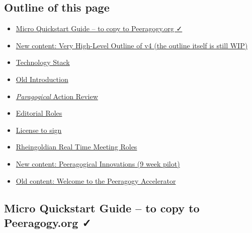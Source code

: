 \hypertarget{outline-of-this-page}{%
\subsection{Outline of this page}\label{outline-of-this-page}}

\begin{itemize}
\tightlist
\item
  \href{http://peeragogy.github.io/action.html\#micro-quickstart-guide--to-copy-to-peeragogyorg-}{Micro
  Quickstart Guide -- to copy to Peeragogy.org ✓}
\item
  \href{http://peeragogy.github.io/action.html\#new-content-very-high-level-outline-of-v4-the-outline-itself-is-still-wip}{New
  content: Very High-Level Outline of v4 (the outline itself is still
  WIP)}
\item
  \href{http://peeragogy.github.io/action.html\#technology-stack}{Technology
  Stack}
\item
  \href{http://peeragogy.github.io/action.html\#old-introduction}{Old
  Introduction}
\item
  \href{http://peeragogy.github.io/action.html\#paragogical-action-review}{\emph{Paragogical}
  Action Review}
\item
  \href{http://peeragogy.github.io/action.html\#editorial-roles}{Editorial
  Roles}
\item
  \href{http://peeragogy.github.io/action.html\#license-to-sign}{License
  to sign}
\item
  \href{http://peeragogy.github.io/action.html\#rheingoldian-real-time-meeting-roles}{Rheingoldian
  Real Time Meeting Roles}
\item
  \href{http://peeragogy.github.io/action.html\#new-content-peeragogical-innovations-9-week-pilot}{New
  content: Peeragogical Innovations (9 week pilot)}
\item
  \href{http://peeragogy.github.io/action.html\#old-content-welcome-to-the-peeragogy-accelerator}{Old
  content: Welcome to the Peeragogy Accelerator}
\end{itemize}

\hypertarget{micro-quickstart-guide-to-copy-to-peeragogy.org}{%
\subsection{Micro Quickstart Guide -- to copy to Peeragogy.org
✓}\label{micro-quickstart-guide-to-copy-to-peeragogy.org}}

